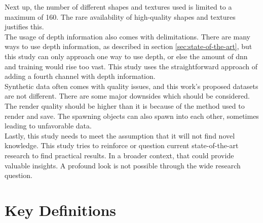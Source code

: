 		Next up, the number of different shapes and textures used is limited to a maximum of 160. The rare availability of high-quality shapes and textures justifies this.\\
		The usage of depth information also comes with delimitations. There are many ways to use depth information, as described in section \ref{sec:state-of-the-art}, but this study can only approach one way to use depth, or else the amount of \ac{dnn} and training would rise too vast. This study uses the straightforward approach of adding a fourth channel with depth information.\\
		Synthetic data often comes with quality issues, and this work's proposed datasets are not different. There are some major downsides which should be considered. The render quality should be higher than it is because of the method used to render and save. The spawning objects can also spawn into each other, sometimes leading to unfavorable data. \\
		Lastly, this study needs to meet the assumption that it will not find novel knowledge. This study tries to reinforce or question current state-of-the-art research to find practical results. In a broader context, that could provide valuable insights. A profound look is not possible through the wide research question.
	
	
	
	\section{Key Definitions}
	\label{sec:key-definitions}
	
